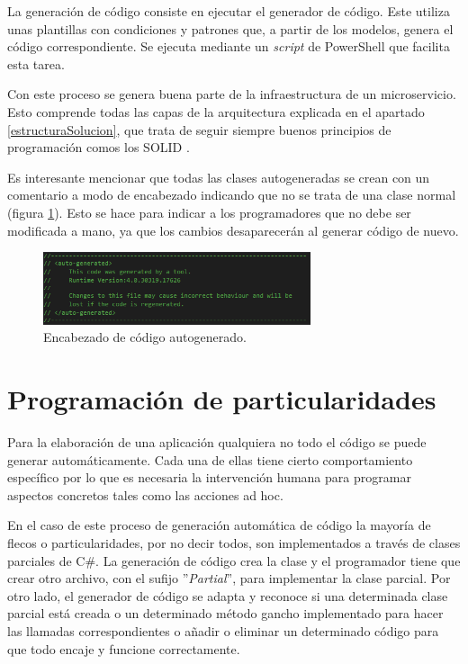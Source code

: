 \documentclass[11pt,spanish,listoffigures]{tfgetsinf}
\begin{document}
La generación de código consiste en ejecutar el generador de código. Este utiliza unas plantillas con condiciones y patrones que, a partir de los modelos, genera el código correspondiente. Se ejecuta mediante un \emph{script} de PowerShell \cite{PowerShell} que facilita esta tarea.

Con este proceso se genera buena parte de la infraestructura de un microservicio. Esto comprende todas las capas de la arquitectura explicada en el apartado \ref{estructuraSolucion}, que trata de seguir siempre buenos principios de programación comos los SOLID \cite{SOLID}.

Es interesante mencionar que todas las clases autogeneradas se crean con un comentario a modo de encabezado indicando que no se trata de una clase normal (figura \ref{encabezadoAutogenerado}). Esto se hace para indicar a los programadores que no debe ser modificada a mano, ya que los cambios desaparecerán al generar código de nuevo.

\begin{figure}[ht]
\centering
\includegraphics[width=0.7\textwidth]{imagenes/apendice/encabezadoAutogenerado}
\caption{Encabezado de código autogenerado.}
	\label{encabezadoAutogenerado}
\end{figure}

	\section{Programación de particularidades}

Para la elaboración de una aplicación qualquiera no todo el código se puede generar automáticamente. Cada una de ellas tiene cierto comportamiento específico por lo que es necesaria la intervención humana para programar aspectos concretos tales como las acciones ad hoc.

En el caso de este proceso de generación automática de código la mayoría de flecos o particularidades, por no decir todos, son implementados a través de clases parciales de C\#. La generación de código crea la clase y el programador tiene que crear otro archivo, con el sufijo ''\emph{Partial}'', para implementar la clase parcial. Por otro lado, el generador de código se adapta y reconoce si una determinada clase parcial está creada o un determinado método gancho implementado para hacer las llamadas correspondientes o añadir o eliminar un determinado código para que todo encaje y funcione correctamente.
\end{document}
